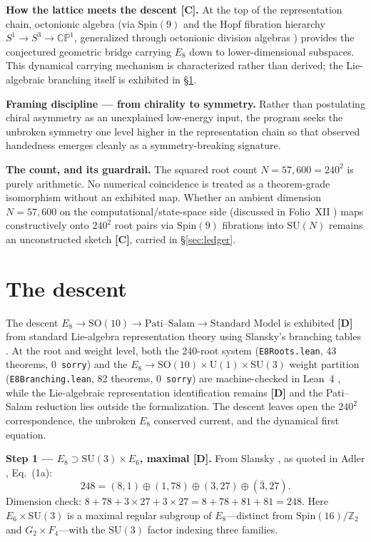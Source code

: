 \documentclass[11pt]{article}
\begin{document}
\noindent\textbf{How the lattice meets the descent [C].} At the top of the representation chain, octonionic algebra (via $\mathrm{Spin}(9)$ and the Hopf fibration hierarchy $S^1 \to S^3 \to \mathbb{CP}^1$, generalized through octonionic division algebras \cite{manogue-dray-wilson}) provides the conjectured geometric bridge carrying $E_8$ down to lower-dimensional subspaces. This dynamical carrying mechanism is characterized rather than derived; the Lie-algebraic branching itself is exhibited in \S\ref{sec:descent}.

\noindent\textbf{Framing discipline --- from chirality to symmetry.} Rather than postulating chiral asymmetry as an unexplained low-energy input, the program seeks the unbroken symmetry one level higher in the representation chain so that observed handedness emerges cleanly as a symmetry-breaking signature.

\noindent\textbf{The count, and its guardrail.} The squared root count $N = 57{,}600 = 240^2$ is purely arithmetic. No numerical coincidence is treated as a theorem-grade isomorphism without an exhibited map. Whether an ambient dimension $N = 57{,}600$ on the computational/state-space side (discussed in Folio~XII \cite{folio-xii}) maps constructively onto $240^2$ root pairs via $\mathrm{Spin}(9)$ fibrations into $\mathrm{SU}(N)$ remains an unconstructed sketch \textbf{[C]}, carried in \S\ref{sec:ledger}.

\section{The descent}
\label{sec:descent}
The descent $E_8 \to \mathrm{SO}(10) \to \text{Pati--Salam} \to \text{Standard Model}$ is exhibited \textbf{[D]} from standard Lie-algebra representation theory using Slansky's branching tables \cite{slansky}. At the root and weight level, both the 240-root system (\texttt{E8Roots.lean}, 43 theorems, 0~\texttt{sorry}) and the $E_8 \to \mathrm{SO}(10) \times \mathrm{U}(1) \times \mathrm{SU}(3)$ weight partition (\texttt{E8Branching.lean}, 82 theorems, 0~\texttt{sorry}) are machine-checked in Lean~4 \cite{res-nova-repo}, while the Lie-algebraic representation identification remains \textbf{[D]} and the Pati--Salam reduction lies outside the formalization. The descent leaves open the $240^2$ correspondence, the unbroken $E_8$ conserved current, and the dynamical first equation.

\noindent\textbf{Step 1 --- $E_8 \supset \mathrm{SU}(3) \times E_6$, maximal [D].} From Slansky \cite{slansky}, as quoted in Adler \cite{adler}, Eq.~(1a):
\begin{equation}
\label{eq:step1}
248 = (8,1) \oplus (1,78) \oplus (3,27) \oplus (\bar{3},\overline{27}).
\end{equation}
Dimension check: $8 + 78 + 3 \times 27 + 3 \times 27 = 8 + 78 + 81 + 81 = 248$. Here $E_6 \times \mathrm{SU}(3)$ is a maximal regular subgroup of $E_8$---distinct from $\mathrm{Spin}(16)/\mathbb{Z}_2$ and $G_2 \times F_4$---with the $\mathrm{SU}(3)$ factor indexing three families.
\end{document}
